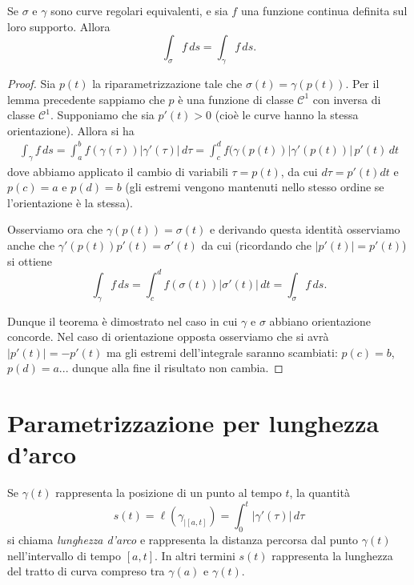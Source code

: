 \documentclass[italian,a4paper,hidelinks]{scrartcl}
\newcommand{\C}{{\mathcal C}}
\begin{document}
\begin{theorem}
Se $\sigma$ e $\gamma$ sono curve regolari equivalenti, e sia $f$ una
funzione continua definita sul loro supporto. Allora
\[
 \int_\sigma f \, ds = \int_\gamma f \, ds.
\]
\end{theorem}

\begin{proof}
Sia $p(t)$ la riparametrizzazione tale che
$\sigma(t) =
\gamma(p(t))$. Per il lemma precedente sappiamo che $p$ è una funzione
di classe $\C^1$ con inversa di classe $\C^1$. Supponiamo che sia
$p'(t)>0$ (cioè le curve hanno la stessa orientazione). Allora si ha
\begin{align*}
\int_\gamma f\, ds = \int_a^b f(\gamma(\tau)) \lvert \gamma'(\tau)\rvert\, d\tau
= \int_c^d f(\gamma(p(t)) \lvert \gamma'(p(t))\rvert\,
p'(t)\, dt
\end{align*}
dove abbiamo applicato il cambio di variabili $\tau = p(t)$, da cui
$d\tau = p'(t) dt$ e $p(c)=a$ e $p(d)=b$ (gli estremi vengono
mantenuti nello stesso ordine se l'orientazione è la stessa).

Osserviamo ora che $\gamma(p(t)) = \sigma(t)$ e derivando questa
identità osserviamo anche che $\gamma'(p(t))p'(t) = \sigma'(t)$ da cui
(ricordando che $\lvert p'(t)\rvert = p'(t)$) si ottiene
\[
  \int_\gamma f\, ds = \int_c^d f(\sigma(t)) \lvert \sigma'(t)\rvert\,
  dt
  = \int_\sigma f\, ds.
\]

Dunque il teorema è dimostrato nel caso in cui $\gamma$ e $\sigma$
abbiano orientazione concorde. Nel caso di orientazione opposta
osserviamo che si avrà $\lvert p'(t)\rvert = - p'(t)$ ma gli estremi
dell'integrale saranno scambiati: $p(c)=b$, $p(d)=a$... dunque alla
fine il risultato non cambia.
\end{proof}

\section{Parametrizzazione per lunghezza d'arco}

Se $\gamma(t)$ rappresenta la posizione di un punto al tempo $t$, la
quantità
$$
s(t) =  \ell(\gamma_{|[a,t]}) = \int_0^t |\gamma'(\tau)|\, d\tau
$$
si chiama \emph{lunghezza d'arco} e
rappresenta la distanza percorsa dal punto $\gamma(t)$ nell'intervallo
di tempo $[a,t]$. In altri termini $s(t)$ rappresenta la lunghezza del
tratto di curva compreso tra $\gamma(a)$ e $\gamma(t)$.
\end{document}
